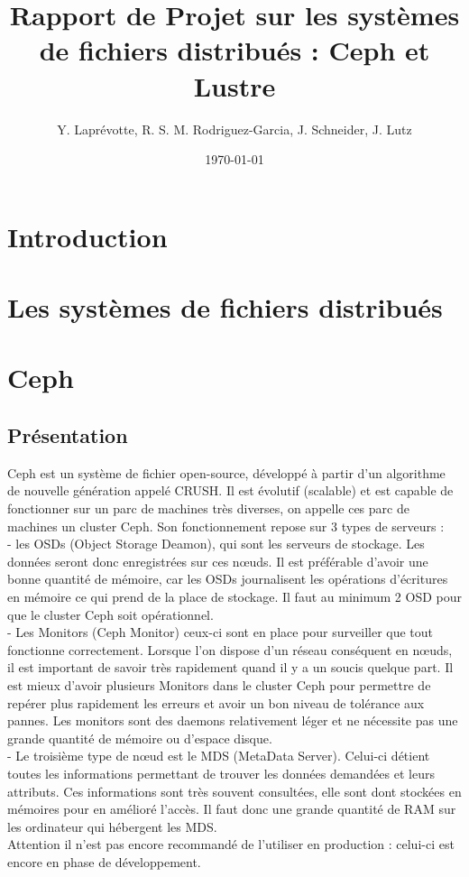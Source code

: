 \documentclass{article}
\title{Rapport de  Projet sur les systèmes de fichiers distribués : Ceph et Lustre}
\author{Y. Laprévotte, R. S. M. Rodriguez-Garcia, J. Schneider, J. Lutz}
\date{\today}
\begin{document}
\pagestyle{fancy}
\lfoot{\today}
 
\maketitle

\newpage
\tableofcontents
\newpage

	\section{Introduction}
	
	\section{Les systèmes de fichiers distribués}
\newpage
	\section{Ceph}
	\subsection{Présentation}
	Ceph est un système de fichier open-source, développé à partir d'un algorithme de nouvelle
génération appelé CRUSH. Il est évolutif (scalable) et est capable de fonctionner sur un parc de machines très diverses, on appelle ces parc de machines un cluster Ceph. Son fonctionnement repose sur 3 types de serveurs :
\\	- les OSDs (Object Storage Deamon), qui sont les serveurs de stockage. Les données seront donc enregistrées sur ces nœuds. Il est préférable d'avoir une bonne quantité de mémoire, car les OSDs journalisent les opérations d'écritures en mémoire ce qui prend de la place de stockage. Il faut au minimum 2 OSD pour que le cluster Ceph soit opérationnel.
\\	- Les Monitors (Ceph Monitor) ceux-ci sont en place pour surveiller que tout fonctionne correctement. Lorsque l'on dispose d'un réseau conséquent en nœuds, il est important de savoir très rapidement quand il y a un soucis quelque part. Il est mieux d'avoir plusieurs Monitors dans le cluster Ceph pour permettre de repérer plus rapidement les erreurs et avoir un bon niveau de tolérance aux pannes. Les monitors sont des daemons relativement léger et ne nécessite pas une grande quantité de mémoire ou d'espace disque.
\\	- Le troisième type de nœud est le MDS (MetaData Server). Celui-ci détient toutes les informations permettant de trouver les données demandées et leurs attributs. Ces informations sont très souvent consultées, elle sont dont stockées en mémoires pour en amélioré l'accès. Il faut donc une grande quantité de RAM sur les ordinateur qui hébergent les MDS.
\\ Attention il n'est pas encore recommandé de l'utiliser en production : celui-ci est encore en phase de développement.
\newpage
\end{document}
